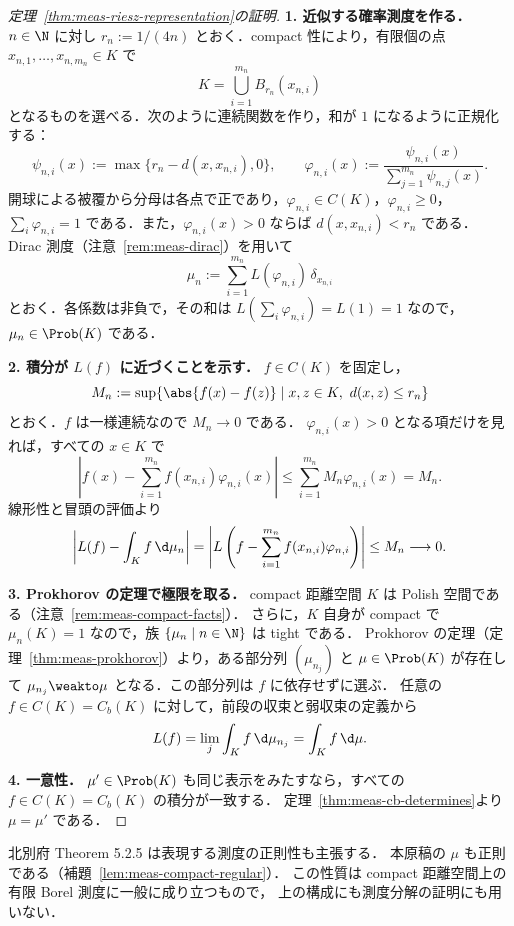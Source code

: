 \begin{proof}[定理~\ref{thm:meas-riesz-representation}の証明]
  \textbf{1. 近似する確率測度を作る．}
  $n\in\N$ に対し $r_n:=1/(4n)$ とおく．compact 性により，有限個の点 $x_{n,1},\dots,x_{n,m_n}\in K$ で
  \[
    K=\bigcup_{i=1}^{m_n}B_{r_n}(x_{n,i})
  \]
  となるものを選べる．次のように連続関数を作り，和が $1$ になるように正規化する：
  \[
    \psi_{n,i}(x):=\max\{r_n-d(x,x_{n,i}),0\},\qquad
    \varphi_{n,i}(x):=\frac{\psi_{n,i}(x)}{\sum_{j=1}^{m_n}\psi_{n,j}(x)}.
  \]
  開球による被覆から分母は各点で正であり，$\varphi_{n,i}\in C(K)$，$\varphi_{n,i}\geq0$，
  $\sum_i\varphi_{n,i}=1$ である．また，$\varphi_{n,i}(x)>0$ ならば $d(x,x_{n,i})<r_n$ である．
  Dirac 測度（注意~\ref{rem:meas-dirac}）を用いて
  \[
    \mu_n:=\sum_{i=1}^{m_n}L(\varphi_{n,i})\,\delta_{x_{n,i}}
  \]
  とおく．各係数は非負で，その和は $L(\sum_i\varphi_{n,i})=L(1)=1$ なので，$\mu_n\in\Prob(K)$ である．

  \textbf{2. 積分が $L(f)$ に近づくことを示す．}
  $f\in C(K)$ を固定し，
  \[
    M_n:=\sup\{\abs{f(x)-f(z)}\mid x,z\in K,\ d(x,z)\leq r_n\}
  \]
  とおく．$f$ は一様連続なので $M_n\to0$ である．
  $\varphi_{n,i}(x)>0$ となる項だけを見れば，すべての $x\in K$ で
  \[
    \left|f(x)-\sum_{i=1}^{m_n}f(x_{n,i})\varphi_{n,i}(x)\right|
    \leq\sum_{i=1}^{m_n}M_n\varphi_{n,i}(x)=M_n.
  \]
  線形性と冒頭の評価より
  \[
    \left|L(f)-\int_Kf\,\d\mu_n\right|
    =\left|L\left(f-\sum_{i=1}^{m_n}f(x_{n,i})\varphi_{n,i}\right)\right|
    \leq M_n\longrightarrow0.
  \]

  \textbf{3. Prokhorov の定理で極限を取る．}
  compact 距離空間 $K$ は Polish 空間である（注意~\ref{rem:meas-compact-facts}）．
  さらに，$K$ 自身が compact で $\mu_n(K)=1$ なので，族 $\{\mu_n\mid n\in\N\}$ は tight である．
  Prokhorov の定理（定理~\ref{thm:meas-prokhorov}）より，ある部分列 $(\mu_{n_j})$ と
  $\mu\in\Prob(K)$ が存在して $\mu_{n_j}\weakto\mu$ となる．この部分列は $f$ に依存せずに選ぶ．
  任意の $f\in C(K)=C_b(K)$ に対して，前段の収束と弱収束の定義から
  \[
    L(f)=\lim_j\int_Kf\,\d\mu_{n_j}=\int_Kf\,\d\mu.
  \]

  \textbf{4. 一意性．}
  $\mu'\in\Prob(K)$ も同じ表示をみたすなら，すべての $f\in C(K)=C_b(K)$ の積分が一致する．
  定理~\ref{thm:meas-cb-determines}より $\mu=\mu'$ である．
\end{proof}

北別府 Theorem 5.2.5 は表現する測度の正則性も主張する．
本原稿の $\mu$ も正則である（補題~\ref{lem:meas-compact-regular}）．
この性質は compact 距離空間上の有限 Borel 測度に一般に成り立つもので，
上の構成にも測度分解の証明にも用いない．

